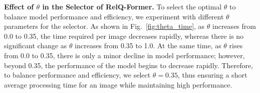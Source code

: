 \begin{table}[t]
    \centering
    \setlength{\tabcolsep}{0.3cm}
    \caption{Results on GQA: PredCls subtask in  closed- and open-set scenarios.}
    \label{tab:rebuttal_gqa}
\end{table}


\begin{table}[!ht]
    \centering
    \setlength{\tabcolsep}{0.35cm}
    \caption{Results on PSG: SGDet subtask in the open-set scenario.}
    \label{tab:rebuttal_psg}
\end{table}


\noindent \textbf{Effect of $\theta$ in the Selector of RelQ-Former.}
To select the optimal $\theta$ to balance model performance and efficiency, we experiment with different $\theta$ parameters for the selector.
As shown in Fig.~\ref{fig:theta_time}, as $\theta$ increases from 0.0 to 0.35, the time required per image decreases rapidly, whereas there is no significant change as $\theta$ increases from 0.35 to 1.0.
At the same time, as $\theta$ rises from 0.0 to 0.35, there is only a minor decline in model performance; however, beyond 0.35, the performance of the model begins to decrease rapidly.
Therefore, to balance performance and efficiency, we select $\theta = 0.35$, thus ensuring a short average processing time for an image while maintaining high performance.


